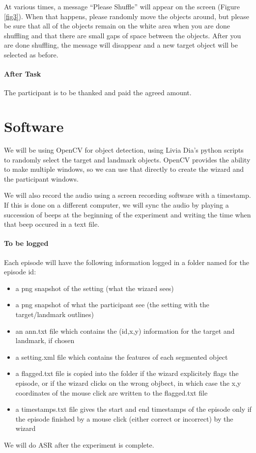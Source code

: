 \documentclass[a4paper,10pt]{article}
\begin{document}
At various times, a message ``Please Shuffle'' will appear on the screen (Figure \ref{fig3}). When that happens, please randomly move the objects around, but please be sure that all of the objects remain on the white area when you are done shuffling and that there are small gaps of space between the objects. After you are done shuffling, the message will disappear and a new target object will be selected as before.

\paragraph{After Task} The participant is to be thanked and paid the agreed amount. 


\section{Software}

We will be using OpenCV for object detection, using Livia Dia's python scripts to randomly select the target and landmark objects. OpenCV provides the ability to make multiple windows, so we can use that directly to create the wizard and the participant windows. 

We will also record the audio using a screen recording software with a timestamp. If this is done on a different computer, we will sync the audio by playing a succession of beeps at the beginning of the experiment and writing the time when that beep occured in a text file.

\paragraph{To be logged} 

Each episode will have the following information logged in a folder named for the episode id:

\begin{itemize}
 \item a png snapshot of the setting (what the wizard sees)
 \item a png snapshot of what the participant see (the setting with the target/landmark outlines)
 \item an ann.txt file which contains the (id,x,y) information for the target and landmark, if chosen
 \item a setting.xml file which contains the features of each segmented object
 \item a flagged.txt file is copied into the folder if the wizard explicitely flags the episode, or if the wizard clicks on the wrong objbect, in which case the x,y coordinates of the mouse click are written to the flagged.txt file
 \item a timestamps.txt file gives the start and end timestamps of the episode only if the episode finished by a mouse click (either correct or incorrect) by the wizard
\end{itemize}

We will do ASR after the experiment is complete. 
\end{document}
